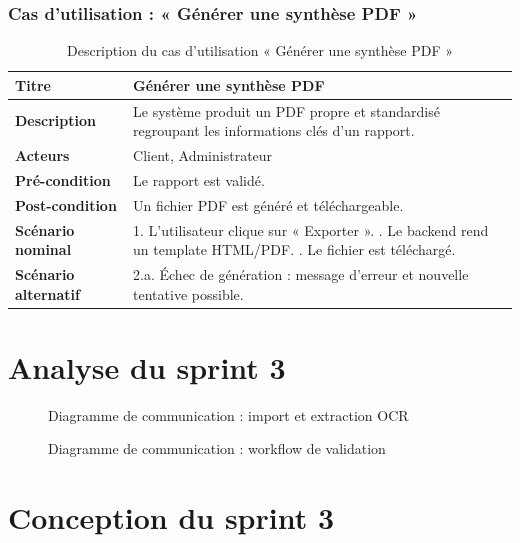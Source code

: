 \subsubsection{Cas d'utilisation : « Générer une synthèse PDF »}
\begin{table}[h!]
\centering
\renewcommand{\arraystretch}{1.3}
\begin{tabularx}{\textwidth}{|l|X|}
\hline
\textbf{Titre} & Générer une synthèse PDF \\ \hline
\textbf{Description} & Le système produit un PDF propre et standardisé regroupant les
informations clés d'un rapport. \\ \hline
\textbf{Acteurs} & Client, Administrateur \\ \hline
\textbf{Pré-condition} & Le rapport est validé. \\ \hline
\textbf{Post-condition} & Un fichier PDF est généré et téléchargeable. \\ \hline
\textbf{Scénario nominal} &
1. L'utilisateur clique sur « Exporter ». \newline
2. Le backend rend un template HTML/PDF. \newline
3. Le fichier est téléchargé. \\ \hline
\textbf{Scénario alternatif} &
2.a. Échec de génération : message d'erreur et nouvelle tentative possible. \\ \hline
\end{tabularx}
\caption{Description du cas d'utilisation « Générer une synthèse PDF »}
\end{table}

\section{Analyse du sprint 3}
\begin{figure}[h!]
\centering
{}
\caption{Diagramme de communication : import et extraction OCR}
\end{figure}

\begin{figure}[h!]
\centering
{}
\caption{Diagramme de communication : workflow de validation}
\end{figure}

\section{Conception du sprint 3}

